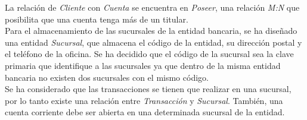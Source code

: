 \documentclass{article}
\begin{document}
La relación de \emph{Cliente} con \emph{Cuenta} se encuentra en \emph{Poseer}, una relación \emph{M:N} que posibilita que una cuenta tenga más de un titular.\\
Para el almacenamiento de las sucursales de la entidad bancaria, se ha diseñado una entidad \emph{Sucursal}, que almacena el código de la entidad, su dirección postal y el teléfono de la oficina. Se ha decidido que el código de la sucursal sea la clave primaria que identifique a las sucursales ya que dentro de la misma entidad bancaria no existen dos sucursales con el mismo código.\\
Se ha considerado que las transacciones se tienen que realizar en una sucursal, por lo tanto existe una relación entre \emph{Transacción} y \emph{Sucursal}. También, una cuenta corriente debe ser abierta en una determinada sucursal de la entidad.\\
\end{document}
